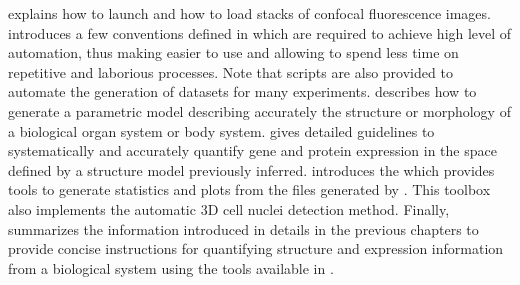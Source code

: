  explains how to launch \wingj and how to load stacks of confocal fluorescence images.  introduces a few conventions defined in \wingj which are required to achieve high level of automation, thus making \wingj easier to use and allowing to spend less time on repetitive and laborious processes. Note that scripts are also provided to automate the generation of datasets for many experiments.  describes how to generate a parametric model describing accurately the structure or morphology of a biological organ system or body system.  gives detailed guidelines to systematically and accurately quantify gene and protein expression in the space defined by a structure model previously inferred.  introduces the \wingjMatlab which provides tools to generate statistics and plots from the files generated by \wingj. This toolbox also implements the automatic 3D cell nuclei detection method. Finally,  summarizes the information introduced in details in the previous chapters to provide concise instructions for quantifying structure and expression information from a biological system using the tools available in \wingj.




